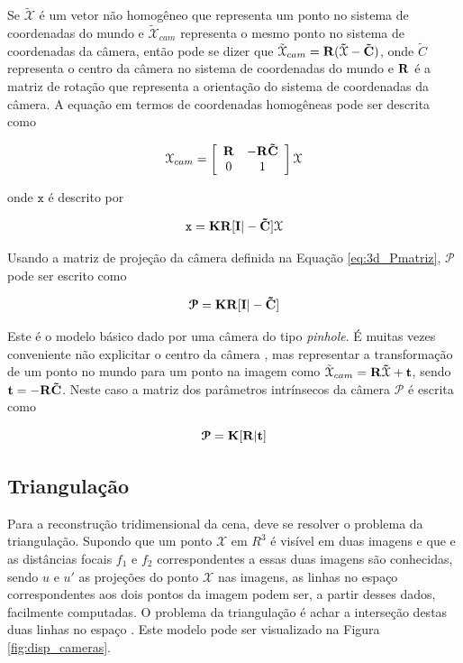 {Se $\tilde{\mathcal{X}}$ é um vetor não homogêneo que representa um ponto no sistema de coordenadas do mundo e $\tilde{\mathcal{X}}_{cam}$ representa o mesmo ponto no sistema de coordenadas da câmera, então pode se dizer que $\tilde{\mathcal{X}}_{cam} = \bf{R}(\tilde{\mathcal{X}} - \tilde{C})$, onde $\tilde{C}$ representa o centro da câmera no sistema de coordenadas do mundo e $\bf{R}$ é a matriz de rotação que representa a orientação do sistema de coordenadas da câmera. A equação em termos de coordenadas homogêneas pode ser descrita como

\begin{align}
\mathcal{X}_{cam} =
\left[\begin{array}{cc}
\bf{R} &  -\bf{R}\tilde{C}\\
0 & 1
\end{array}\right]
\mathcal{X}
\label{eq:3d_matRot}
\end{align}

onde $\mathtt{x}$ é descrito por

\begin{equation}
\mathtt{x} = \bf{K}\bf{R}[\bf{I}|-\tilde{C}]\mathcal{X}
\label{eq:3d_camModel2}
\end{equation}

Usando a matriz de projeção da câmera definida na Equação \ref{eq:3d_Pmatriz},  $\bm{\mathcal{P}}$ pode ser escrito como

\begin{equation}
\bm{\mathcal{P}} = \bf{K}\bf{R}[\bf{I}|-\tilde{C}]
\label{eq:3d_PModel1}
\end{equation}


Este é o modelo básico dado por uma câmera do tipo \textit{pinhole}. É muitas vezes conveniente não explicitar o centro da câmera \cite{hartley2003multiple}, mas representar a transformação de um ponto no mundo para um ponto na imagem como $\tilde{\mathcal{X}}_{cam} = \bf{R}\tilde{\mathcal{X}} + \bf{t}$, sendo $\bf{t} =-\bf{R}\tilde{C}$. Neste caso a matriz dos parâmetros intrínsecos da câmera $\bm{\mathcal{P}}$  é escrita como

\begin{equation}
\bm{\mathcal{P}} = \bf{K}[\bf{R}|\bf{t}]
\label{eq:3d_PModel2}
\end{equation}

\subsection{Triangulação}

Para a reconstrução tridimensional da cena, deve se resolver o problema da triangulação. Supondo que um ponto $\mathcal{X}$ em $R^3$ é visível em duas imagens e que e as distâncias focais $f_1$ e $f_2$ correspondentes a essas duas imagens são conhecidas, sendo $u$ e $u'$ as projeções do ponto $\mathcal{X}$ nas imagens, as linhas no espaço correspondentes aos dois pontos da imagem podem ser, a partir desses dados, facilmente computadas. O problema da triangulação é achar a interseção destas duas linhas no espaço \cite{hartley1997triangulation}. Este modelo pode ser visualizado na Figura \ref{fig:disp_cameras}.

}

